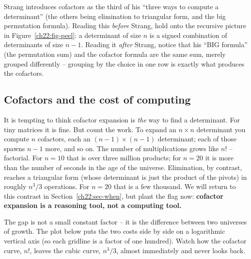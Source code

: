 \begin{strangbox}
Strang introduces cofactors as the third of his ``three ways to compute a determinant'' (the others
being elimination to triangular form, and the big permutation formula). Reading this \emph{before}
Strang, hold onto the recursive picture in Figure~\ref{ch22:fig-peel}: a determinant of size $n$ is a
signed combination of determinants of size $n-1$. Reading it \emph{after} Strang, notice that his
``BIG formula'' (the permutation sum) and the cofactor formula are the same sum, merely grouped
differently -- grouping by the choice in one row is exactly what produces the cofactors.
\end{strangbox}

\subsection{Cofactors and the cost of computing}

It is tempting to think cofactor expansion is \emph{the} way to find a determinant. For tiny matrices
it is fine. But count the work. To expand an $n\times n$ determinant you compute $n$ cofactors, each
an $(n-1)\times(n-1)$ determinant; each of those spawns $n-1$ more, and so on. The number of
multiplications grows like $n!$ -- factorial. For $n=10$ that is over three million products; for
$n=20$ it is more than the number of seconds in the age of the universe. Elimination, by contrast,
reaches a triangular form (whose determinant is just the product of the pivots) in roughly $n^3/3$
operations. For $n=20$ that is a few thousand. We will return to this contrast in
Section~\ref{ch22:sec-when}, but plant the flag now: \textbf{cofactor expansion is a reasoning tool,
not a computing tool.}

The gap is not a small constant factor -- it is the difference between two universes of growth. The
plot below puts the two costs side by side on a logarithmic vertical axis (so each gridline is a
factor of one hundred). Watch how the cofactor curve, $n!$, leaves the cubic curve, $n^3/3$, almost
immediately and never looks back.

